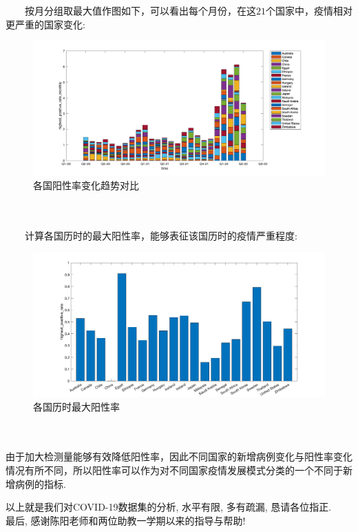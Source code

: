 \documentclass[a4paper, titlepage]{article}
\begin{document}
    　　按月分组取最大值作图如下，可以看出每个月份，在这$21$个国家中，疫情相对更严重的国家变化:\\
    \begin{minipage}{\textwidth}
        \begin{figure}[H]
            \centering
            \includegraphics[width=\textwidth]{./images/PositiveRate_3.png}
            \vspace{-1.5em}
            \caption{各国阳性率变化趋势对比}
            \label{images:PositiveRate_3}
        \end{figure}
    \end{minipage}\\ \quad\\\newpage
    　　计算各国历时的最大阳性率，能够表征该国历时的疫情严重程度:\\
    \begin{minipage}{\textwidth}
        \begin{figure}[H]
            \centering
            \includegraphics[width=\textwidth]{./images/PositiveRate_2.png}
            \caption{各国历时最大阳性率}
            \label{images:PositiveRate_2}
        \end{figure}
    \end{minipage}\\\quad\\
    由于加大检测量能够有效降低阳性率，因此不同国家的新增病例变化与阳性率变化情况有所不同，所以阳性率可以作为对不同国家疫情发展模式分类的一个不同于新增病例的指标. 
    \vspace{5cm}
    \begin{center}
    以上就是我们对COVID-19数据集的分析, 水平有限, 多有疏漏, 恳请各位指正. \\
    最后, 感谢陈阳老师和两位助教一学期以来的指导与帮助!
    \end{center}
    \newpage
    \appendix
\end{document}
